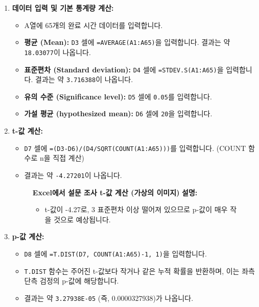 \documentclass[11pt,a4paper]{book}
\providecommand{\captionof}[2]{\textbf{#2}}
\theoremstyle{definition}
\begin{document}
\begin{enumerate}
    \item \textbf{데이터 입력 및 기본 통계량 계산:}
    \begin{itemize}
        \item A열에 65개의 완료 시간 데이터를 입력합니다.
        \item \textbf{평균 (Mean):} \texttt{D3} 셀에 \texttt{=AVERAGE(A1:A65)}을 입력합니다. 결과는 약 \texttt{18.03077}이 나옵니다.
        \item \textbf{표준편차 (Standard deviation):} \texttt{D4} 셀에 \texttt{=STDEV.S(A1:A65)}을 입력합니다. 결과는 약 \texttt{3.716388}이 나옵니다.
        \item \textbf{유의 수준 (Significance level):} \texttt{D5} 셀에 \texttt{0.05}를 입력합니다.
        \item \textbf{가설 평균 (hypothesized mean):} \texttt{D6} 셀에 \texttt{20}을 입력합니다.
    \end{itemize}

    \item \textbf{t-값 계산:}
    \begin{itemize}
        \item \texttt{D7} 셀에 \texttt{=(D3-D6)/(D4/SQRT(COUNT(A1:A65)))}를 입력합니다. (COUNT 함수로 n을 직접 계산)
        \item 결과는 약 \texttt{-4.27201}이 나옵니다.
    \end{itemize}
    \begin{figure}[h!]
        \centering
        \captionof{figure}{Excel에서 설문 조사 t-값 계산 (가상의 이미지)}
        \label{fig:excel_survey_t_value}
        \vspace{0.5em}
        \textbf{설명:}
        \begin{itemize}
            \item t-값이 -4.27로, 3 표준편차 이상 떨어져 있으므로 p-값이 매우 작을 것으로 예상됩니다.
        \end{itemize}
    \end{figure}

    \item \textbf{p-값 계산:}
    \begin{itemize}
        \item \texttt{D8} 셀에 \texttt{=T.DIST(D7, COUNT(A1:A65)-1, 1)}을 입력합니다.
        \item \texttt{T.DIST} 함수는 주어진 t-값보다 작거나 같은 누적 확률을 반환하며, 이는 좌측 단측 검정의 p-값에 해당합니다.
        \item 결과는 약 \texttt{3.27938E-05} (즉, 0.0000327938)가 나옵니다.
    \end{itemize}


\end{enumerate}
\end{document}
